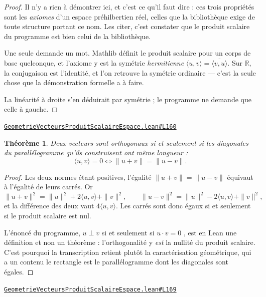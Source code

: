 \documentclass[11pt,a4paper]{article}
\theoremstyle{definition}
\theoremstyle{plain}
\newtheorem{theoreme}{Théorème}
\newcommand{\source}[2]{\par\smallskip\noindent\hfill{\footnotesize\href{#1}{\texttt{#2}}}\par\smallskip}
\begin{document}
\begin{proof}
Il n'y a rien à démontrer ici, et c'est ce qu'il faut dire : ces trois propriétés sont les
\emph{axiomes} d'un espace préhilbertien réel, celles que la bibliothèque exige de toute
structure portant ce nom. Les citer, c'est constater que le produit scalaire du programme
est bien celui de la bibliothèque.

Une seule demande un mot. Mathlib définit le produit scalaire pour un corps de base
quelconque, et l'axiome y est la symétrie \emph{hermitienne}
$\langle u, v\rangle = \overline{\langle v, u\rangle}$. Sur $\mathbb{R}$, la conjugaison est
l'identité, et l'on retrouve la symétrie ordinaire — c'est la seule chose que la
démonstration formelle a à faire.

La linéarité à droite s'en déduirait par symétrie ; le programme ne demande que celle à
gauche.
\end{proof}
\source{https://github.com/Commutator-IO/learn-lean/blob/main/courses/02-lycee/08-geometrie-vecteurs-produit-scalaire-espace/GeometrieVecteursProduitScalaireEspace.lean\#L160}{GeometrieVecteursProduitScalaireEspace.lean\#L160}

\begin{theoreme}
Deux vecteurs sont orthogonaux si et seulement si les diagonales du parallélogramme qu'ils
construisent ont même longueur :
\[ \langle u, v\rangle = 0 \iff \|u + v\| = \|u - v\| . \]
\end{theoreme}

\begin{proof}
Les deux normes étant positives, l'égalité $\|u+v\| = \|u-v\|$ équivaut à l'égalité de
leurs carrés. Or
\[ \|u + v\|^{2} = \|u\|^{2} + 2\langle u, v\rangle + \|v\|^{2} , \qquad
   \|u - v\|^{2} = \|u\|^{2} - 2\langle u, v\rangle + \|v\|^{2} , \]
et la différence des deux vaut $4\langle u, v\rangle$. Les carrés sont donc égaux si et
seulement si le produit scalaire est nul.

\medskip\noindent
L'énoncé du programme, \og{} $u \perp v$ si et seulement si $u \cdot v = 0$ \fg{}, est en
Lean une définition et non un théorème : l'orthogonalité y \emph{est} la nullité du
produit scalaire. C'est pourquoi la transcription retient plutôt la caractérisation
géométrique, qui a un contenu \textemdash{} le rectangle est le parallélogramme dont les
diagonales sont égales.
\end{proof}
\source{https://github.com/Commutator-IO/learn-lean/blob/main/courses/02-lycee/08-geometrie-vecteurs-produit-scalaire-espace/GeometrieVecteursProduitScalaireEspace.lean\#L169}{GeometrieVecteursProduitScalaireEspace.lean\#L169}
\end{document}
